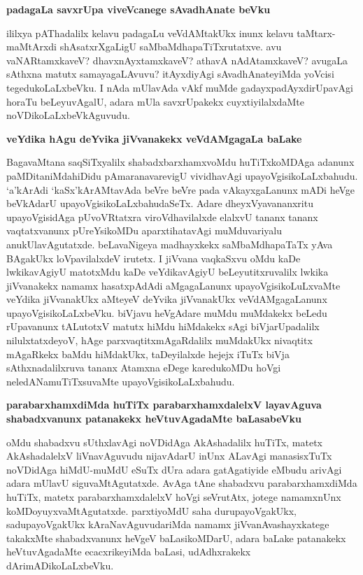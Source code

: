 \eject

{\bigskip
\noindent
{\large\bf padagaLa savxrUpa viveVcanege sAvadhAnate beVku}}\label{page191}
\medskip

\noindent
ililxya pAThadalilx kelavu padagaLu veVdAMtakUkx inunx kelavu taMtarx-maMtArxdi shAsatxrXgaLigU saMbaMdha\-paTiTxrutatxve. avu vaNARtamxkaveV? dhavxnAyxtamxkaveV? athavA nAdAtamxkaveV? avugaLa sAthxna matutx samaya\-gaLAvuvu? itAyxdiyAgi sAvadhAnateyiMda yoVcisi tegedukoLaLxbeVku. I nAda mUlavAda vAkf muMde gadayxpadAyxdirUpavAgi horaTu beLeyuvAgalU, adara mUla savxrUpakekx cuyxtiyilalxdaMte noVDikoLaLxbeVkAguvudu.

{\bigskip
\noindent
{\large\bf veYdika hAgu deYvika jiVvanakekx veVdAMgagaLa baLake}}\label{page191}
\medskip

\noindent
BagavaMtana saqSiTxyalilx shabadxbarxhamxvoMdu huTiTxkoMDAga adanunx paMDitaniMda\break hiDidu pAmaranavare\-vigU vividhavAgi upayoVgisikoLaLxbahudu. `a'kArAdi `kaSx'kArAMtavAda beVre beVre pada vAkayx\-gaLanunx mADi heVge beVkAdarU upa\break\-yoVgisikoLaLxbahudaSeTx. Adare dheyxVyavananxritu upayoVgisi\-dAga pUvoVR\-tatxra viroVdhavilalxde elalxvU tananx tananx vaqtatxvanunx pUreYsikoMDu aparxtihatavAgi muMdu\-variyalu anukUlavAgutatxde. beLavaNigeya madhayxkekx saMbaMdhapaTaTx yAva BAgakUkx loVpavilalxdeV irutetx. I jiVvana vaqkaSxvu oMdu kaDe lwkikavAgiyU matotxMdu kaDe veYdikavAgiyU beLeyu\-titxruvalilx lwkika jiVvanakekx namamx hasatx\break\-pAdAdi aMgagaLanunx upayoVgisikoLuLxvaMte veYdika jiVvanakUkx aMteyeV deYvika jiVvanakUkx veVdAMgagaLanunx upayoVgisikoLaLxbeVku. biVjavu heVgAdare muMdu muMdakekx beLedu rUpavanunx tALutotxV matutx hiMdu hiMdakekx sAgi biVja\-rUpa\-dalilx nilulxtatxdeyoV, hAge parxvaqtitxmAgaRdalilx muMdakUkx nivaqtitx mAgaRkekx baMdu hiMdakUkx, taDeyilalxde hejejx iTuTx biVja sAthxna\-dalilxruva tananx Atamxna eDege karedu\-koMDu hoVgi neledANamuTiTxsuvaMte upayoVgisikoLaLxbahudu.

{\bigskip
\noindent
{\large\bf parabarxhamxdiMda huTiTx parabarxhamxdalelxV layavAguva shabadxvanunx patanakekx heVtuvAgadaMte baLasabeVku}}\label{page193}
\medskip

\noindent
oMdu shabadxvu sUthxlavAgi noVDidAga AkAshadalilx huTiTx, matetx AkAshadalelxV liVna\-vAguvudu nija\-vAdarU inUnx ALavAgi manasisxTuTx noVDidAga hiMdU\break-muMdU eSuTx dUra adara gatAgatiyide eMbudu arivAgi adara mUlavU siguvaMtAgutatxde. AvAga tAne shabadxvu parabarxhamxdiMda huTiTx, matetx parabarxhamxdalelxV hoVgi seVrutAtx, jotege namamxnUnx koMDoyuyxvaMtAgutatxde. parxtiyoMdU saha durupayoVgakUkx, sadupayoVgakUkx kAraNavAguvudariMda namamx jiVvanAvashayxkatege takakxMte shabadx\-vanunx heVgeV baLasikoMDarU, adara baLake patanakekx heVtuvAgadaMte ecacxrikeyiMda baLasi, udAdhxrakekx dAri\-mADikoLaLxbeVku.

